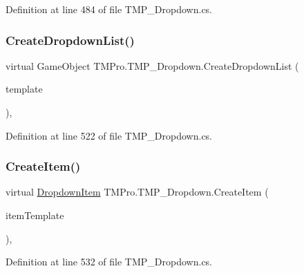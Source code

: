 Definition at line 484 of file T\+M\+P\+\_\+\+Dropdown.\+cs.

\mbox{\label{class_t_m_pro_1_1_t_m_p___dropdown_ae6ae9d5a3c350ec81e2108ad6ccf254e}} 
\subsubsection{\texorpdfstring{CreateDropdownList()}{CreateDropdownList()}}
{\footnotesize\ttfamily virtual Game\+Object T\+M\+Pro.\+T\+M\+P\+\_\+\+Dropdown.\+Create\+Dropdown\+List (\begin{DoxyParamCaption}\item[{Game\+Object}]{template }\end{DoxyParamCaption})\hspace{0.3cm}{\ttfamily [protected]}, {\ttfamily [virtual]}}



Definition at line 522 of file T\+M\+P\+\_\+\+Dropdown.\+cs.

\mbox{\label{class_t_m_pro_1_1_t_m_p___dropdown_a267fae8bb58d334e133686395b615bf1}} 
\subsubsection{\texorpdfstring{CreateItem()}{CreateItem()}}
{\footnotesize\ttfamily virtual \mbox{\hyperlink{class_t_m_pro_1_1_t_m_p___dropdown_1_1_dropdown_item}{Dropdown\+Item}} T\+M\+Pro.\+T\+M\+P\+\_\+\+Dropdown.\+Create\+Item (\begin{DoxyParamCaption}\item[{\mbox{\hyperlink{class_t_m_pro_1_1_t_m_p___dropdown_1_1_dropdown_item}{Dropdown\+Item}}}]{item\+Template }\end{DoxyParamCaption})\hspace{0.3cm}{\ttfamily [protected]}, {\ttfamily [virtual]}}



Definition at line 532 of file T\+M\+P\+\_\+\+Dropdown.\+cs.

\mbox{\label{class_t_m_pro_1_1_t_m_p___dropdown_a1bf1e08099436573116705840810dc3f}} 
